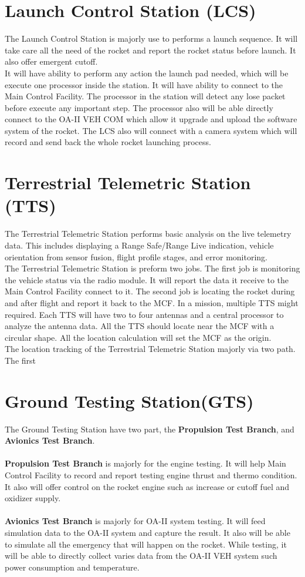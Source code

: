 \documentclass[12pt,article]{memoir}
\begin{document}
\section{Launch Control Station (LCS)}
The Launch Control Station is majorly use to performs a launch sequence. It will take care all the need of the rocket and report the rocket status before launch. It also offer emergent cutoff. \\
It will have ability to perform any action the launch pad needed, which will be execute one processor inside the station. It will have ability to connect to the Main Control Facility. The processor in the station will detect any lose packet before execute any important step. The processor also will be able directly connect to the OA-II VEH COM which allow it upgrade and upload the software system of the rocket. The LCS also will connect with a camera system which will record and send back the whole rocket launching process. 
\section{Terrestrial Telemetric Station (TTS)}
The Terrestrial Telemetric Station performs basic analysis on the live telemetry data. This includes displaying a Range Safe/Range Live indication, vehicle orientation from sensor fusion, flight profile stages, and error monitoring.\\
The Terrestrial Telemetric Station is preform two jobs. The first job is monitoring the vehicle status via the radio module. It will report the data it receive to the Main Control Facility connect to it. The second job is locating the rocket during and after flight and report it back to the MCF. In a mission, multiple TTS might required. Each TTS will have two to four antennas and a central processor to analyze the antenna data. All the TTS should locate near the MCF with a circular shape. All the location calculation will set the MCF as the origin.\\
The location tracking of the Terrestrial Telemetric Station majorly via two path. The first
\section{Ground Testing Station(GTS)}
The Ground Testing Station have two part, the \textbf{Propulsion Test Branch}, and \textbf{Avionics Test Branch}.\\\\
\textbf{Propulsion Test Branch} is majorly for the engine testing. It will help Main Control Facility to record and report testing engine thrust and thermo condition. It also will offer control on the rocket engine such as increase or cutoff fuel and oxidizer supply.\\\\
\textbf{Avionics Test Branch} is majorly for OA-II system testing. It will feed simulation data to the OA-II system and capture the result. It also will be able to simulate all the emergency that will happen on the rocket. While testing, it will be able to directly collect varies data from the OA-II VEH system such power consumption and temperature.
\newpage
\end{document}
